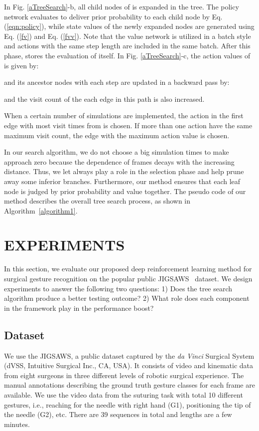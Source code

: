 \documentclass[letterpaper, 10 pt, conference]{ieeeconf}
\begin{document}
In Fig. \ref{aTreeSearch}-b, all child nodes  of  is expanded in the tree. The policy network evaluates  to deliver prior probability  to each child node  by Eq. (\ref{eqn:policy}), while state values of the newly expanded nodes are generated using Eq. (\ref{fv}) and Eq. (\ref{fvv}). Note that the value network is utilized in a batch style and actions with the same step length are included in the same batch. After this phase,  stores the evaluation  of itself.
In Fig. \ref{aTreeSearch}-c, the action values of  is given by:

and its ancestor nodes with each step  are updated in a backward pass by:

and the visit count  of the each edge in this path is also increased. 
	
When a certain number of simulations are implemented, the action in the first edge with most visit times from  is chosen. If more than one action have the same maximum visit count, the edge with the maximum action value is chosen. 

In our search algorithm, we do not choose a big simulation times to make  approach zero because the dependence of frames decays with the increasing distance. Thus, we let  always play a role in the selection phase and help prune away some inferior branches. Furthermore, our method ensures that each leaf node is judged by prior probability and value together. The pseudo code of our method describes the overall tree search process, as shown in Algorithm~\ref{algorithm1}.

		
\section{EXPERIMENTS}
\label{EXPERIMENTS}
In this section, we evaluate our proposed deep reinforcement learning method for surgical gesture recognition on the popular public JIGSAWS~\cite{gao2014jhu,ahmidi2017dataset} dataset.
We design experiments to answer the following two questions: 1) Does the tree search algorithm produce a better testing outcome? 2)  What role does each component in the framework play in the performance boost?
\subsection{Dataset}
We use the JIGSAWS, a public dataset captured by the \textit{da Vinci} Surgical System (dVSS, Intuitive Surgical Inc., CA, USA). It consists of video and kinematic data
from eight surgeons in three different levels of robotic surgical experience. The manual annotations describing the ground truth gesture classes for each frame are available. We use the video data from the suturing task with total 10 different gestures, i.e., reaching for the needle with right hand (G1), positioning the tip of the needle (G2), etc. There are 39 sequences in total and lengths are a few minutes. 
\end{document}
